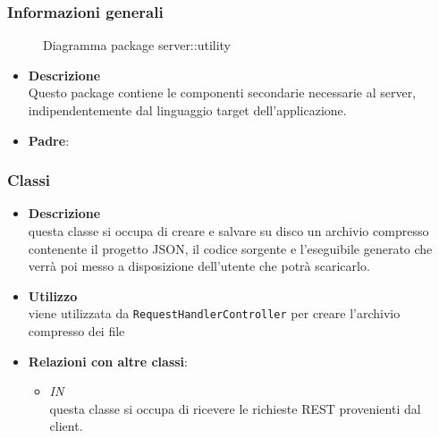 \subsubsection{Informazioni generali}
\begin{figure}[H]
	\caption{Diagramma package server::utility}
\end{figure}
\begin{itemize}
\item \textbf{Descrizione}\\
Questo package contiene le componenti secondarie necessarie al server, indipendentemente dal linguaggio target dell'applicazione.
\item \textbf{Padre}: \hyperref[\nogloxy{swedesigner::server}]{}
\end{itemize}
\subsubsection{Classi}
\label{\nogloxy{swedesigner::server::utility::Compressor}}
\begin{itemize}
\item \textbf{Descrizione}\\
questa classe si occupa di creare e salvare su disco un archivio compresso contenente il progetto JSON, il codice sorgente e l'eseguibile generato che verrà poi messo a disposizione dell'utente che potrà scaricarlo.
\item \textbf{Utilizzo}\\
viene utilizzata da \texttt{RequestHandlerController} per creare l'archivio compresso dei file
\item \textbf{Relazioni con altre classi}:
\begin{itemize}
\item \textit{IN} \hyperref[\nogloxy{swedesigner::server::controller::RequestHandlerController}]{}\\
questa classe si occupa di ricevere le richieste REST provenienti dal client.
\end{itemize}
\end{itemize}

